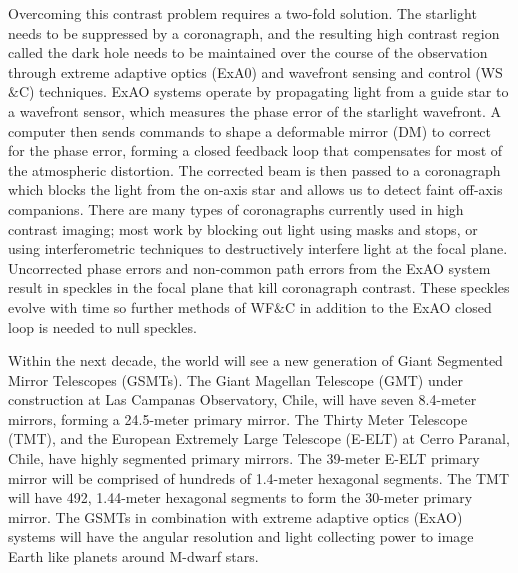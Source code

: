  Overcoming this contrast problem requires a two-fold solution. The starlight needs to be suppressed by a coronagraph, and the resulting high contrast region called the dark hole needs to be maintained over the course of the observation through extreme adaptive optics (ExA0)  and wavefront sensing and control (WS$\&$C) techniques. ExAO systems operate by propagating light from a guide star to a wavefront sensor, which measures the phase error of the starlight wavefront. A computer then sends commands to shape a deformable mirror (DM) to correct for the phase error, forming a closed feedback loop that compensates for most of the atmospheric distortion. The corrected beam is then passed to a coronagraph which blocks the light from the on-axis star and allows us to detect faint off-axis companions. There are many types of coronagraphs currently used in high contrast imaging; most work by blocking out light using masks and stops\cite{soummer2004apodized}, or using interferometric techniques to destructively interfere light at the focal plane.\cite{foo2005optical} Uncorrected phase errors and  non-common path errors from the ExAO system result in speckles in the focal plane that kill coronagraph contrast. These speckles evolve with time\cite{goebel2016evolutionary} so further methods of WF$\&$C in addition to the ExAO closed loop is needed to null speckles.  

Within the next decade, the world will see a new generation of Giant Segmented Mirror Telescopes (GSMTs). The Giant Magellan Telescope\cite{fanson2020overview} (GMT) under construction at Las Campanas Observatory, Chile, will have seven 8.4-meter mirrors, forming a 24.5-meter primary mirror. The Thirty Meter Telescope\cite{chisholm2020thirty} (TMT), and the European Extremely Large Telescope\cite{ramsay2020eso} (E-ELT) at Cerro Paranal, Chile, have highly segmented primary mirrors. The 39-meter E-ELT primary mirror will be comprised of hundreds of 1.4-meter hexagonal segments. The TMT will have 492\cite{sanders2013thirty}, 1.44-meter hexagonal segments to form the 30-meter primary mirror. The GSMTs in combination with extreme adaptive optics (ExAO) systems will have the angular resolution and light collecting power to image Earth like planets around M-dwarf stars\cite{males2019gmagao}. 

